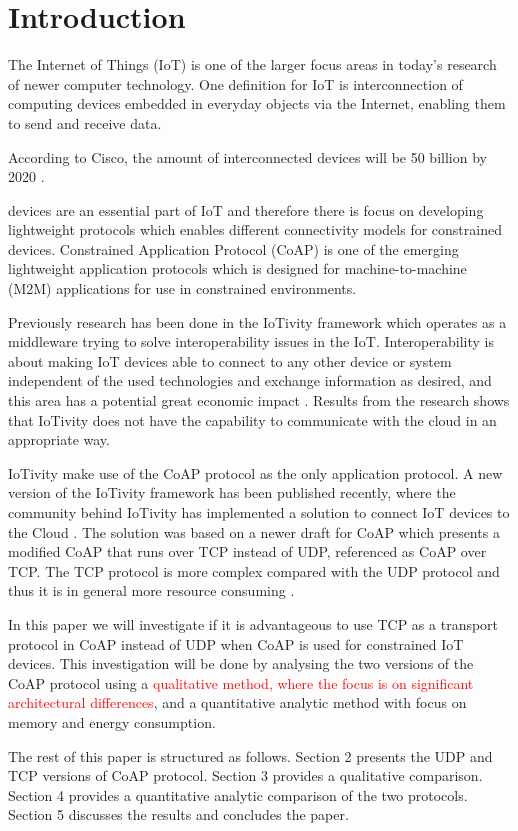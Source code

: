 \section{Introduction}
The Internet of Things (IoT) is one of the larger focus areas in today's research of newer computer technology. One definition for IoT is interconnection of computing devices embedded in everyday objects via the Internet, enabling them to send and receive data.

According to Cisco, the amount of interconnected devices will be 50 billion by 2020 \cite{ciscoiot:online} \cite{Inter74:online}.

 devices are an essential part of IoT and therefore there is focus on developing lightweight protocols which enables different connectivity models for constrained devices.  
Constrained Application Protocol (CoAP) \cite{rfc7252} is one of the emerging lightweight application protocols which is designed for machine-to-machine (M2M) applications for use in constrained environments.   

Previously research has been done \cite{interoperabilityChallenge} in the IoTivity framework which operates as a middleware trying to solve interoperability issues in the IoT. Interoperability is about making IoT devices able to connect to any other device or system independent of the used technologies and exchange information as desired, and this area has a potential great economic impact \cite{Unloc34:online}. 
Results from the research shows that IoTivity does not have the capability to communicate with the cloud in an appropriate way. 

IoTivity make use of the CoAP protocol as the only application protocol. 
A new version of the IoTivity framework has been published recently, where the community behind IoTivity has implemented a solution to connect IoT devices to the Cloud \cite{IoTiv3:online}. The solution was based on a newer draft for CoAP \cite{ietf-core-coap-tcp-tls-02} which presents a modified CoAP that runs over TCP instead of UDP, referenced as CoAP over TCP.
The TCP protocol is more complex compared with the UDP protocol and thus it is in general more resource consuming \cite{giannoulis2009tcp}.


In this paper we will investigate if it is advantageous to use TCP as a transport protocol in CoAP instead of UDP when CoAP is used for constrained IoT devices. This investigation will be done by analysing the two versions of the CoAP protocol using a \textcolor{red}{qualitative method, where the focus is on significant architectural differences}, and a quantitative analytic method with focus on memory and energy consumption. 

The rest of this paper is structured as follows.  Section 2 presents the UDP and TCP versions of CoAP protocol. Section 3 provides a qualitative comparison. Section 4 provides a quantitative analytic comparison of the two protocols. Section 5 discusses the results and concludes the paper.     
